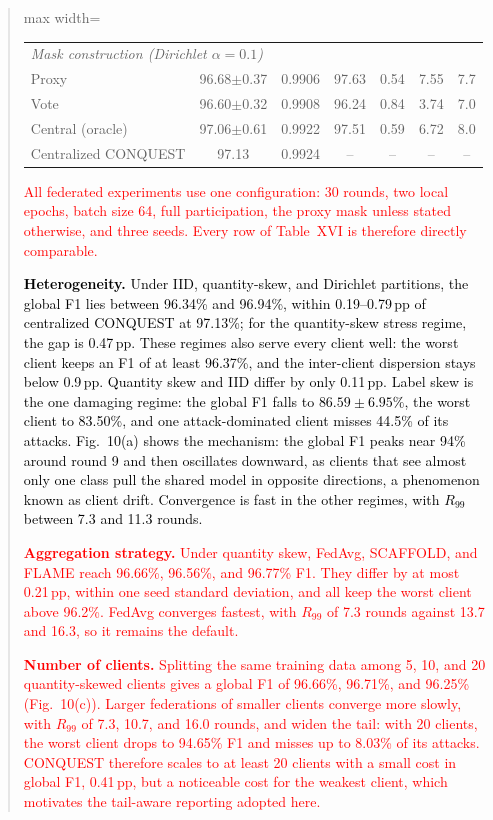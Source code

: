 \documentclass[11pt]{article}
\newenvironment{excerpt}{\begin{quote}\sloppy}{\end{quote}}
\begin{document}
\begin{excerpt}
\begin{table}[H]
\begin{adjustbox}{max width=\linewidth}
\begin{tabular}{lcccccc}
\midrule
\multicolumn{7}{l}{\textit{Mask construction (Dirichlet $\alpha{=}0.1$)}} \\
Proxy & 96.68$\pm$0.37 & 0.9906 & 97.63 & 0.54 & 7.55 & 7.7 \\
Vote & 96.60$\pm$0.32 & 0.9908 & 96.24 & 0.84 & 3.74 & 7.0 \\
Central (oracle) & 97.06$\pm$0.61 & 0.9922 & 97.51 & 0.59 & 6.72 & 8.0 \\
\midrule
Centralized CONQUEST & 97.13 & 0.9924 & -- & -- & -- & -- \\
\hline\toprule
\end{tabular}
\end{adjustbox}
\end{table}

\textcolor{red}{All federated experiments
use one configuration: 30 rounds, two local epochs, batch size 64,
full participation, the proxy mask unless stated otherwise, and three
seeds. Every row of Table~XVI is
therefore directly comparable.}

\textcolor{black}{\textbf{Heterogeneity.} Under IID,
quantity-skew, and Dirichlet partitions, the global F1 lies between
96.34\% and 96.94\%, within 0.19--0.79\,pp of centralized CONQUEST at
97.13\%; for the quantity-skew stress regime, the gap is 0.47\,pp.
These regimes also serve every client well: the worst client keeps an
F1 of at least 96.37\%, and the inter-client dispersion stays below
0.9\,pp. Quantity skew and IID differ by only 0.11\,pp. Label skew is the one
damaging regime: the global F1 falls to $86.59\pm6.95\%$, the worst
client to 83.50\%, and one attack-dominated client misses 44.5\% of
its attacks. Fig.~10(a) shows the mechanism:
the global F1 peaks near 94\% around round 9 and then oscillates
downward, as clients that see almost only one class pull the shared
model in opposite directions, a phenomenon known as client drift.
Convergence is fast in the other regimes, with $R_{99}$ between 7.3
and 11.3 rounds.}

\textcolor{red}{\textbf{Aggregation
strategy.} Under quantity skew, FedAvg, SCAFFOLD, and FLAME reach
96.66\%, 96.56\%, and 96.77\% F1. They differ by at most 0.21\,pp,
within one seed standard deviation, and all keep the worst client
above 96.2\%. FedAvg converges fastest, with $R_{99}$ of 7.3 rounds
against 13.7 and 16.3, so it remains the default.}

\textcolor{red}{\textbf{Number of clients.} Splitting the
same training data among 5, 10, and 20 quantity-skewed clients gives a
global F1 of 96.66\%, 96.71\%, and 96.25\%
(Fig.~10(c)). Larger federations of smaller
clients converge more slowly, with $R_{99}$ of 7.3, 10.7, and 16.0
rounds, and widen the tail: with 20 clients, the worst client drops to
94.65\% F1 and misses up to 8.03\% of its attacks. CONQUEST therefore
scales to at least 20 clients with a small cost in global F1,
0.41\,pp, but a noticeable cost for the weakest client, which
motivates the tail-aware reporting adopted here.}
\end{excerpt}
\end{document}
